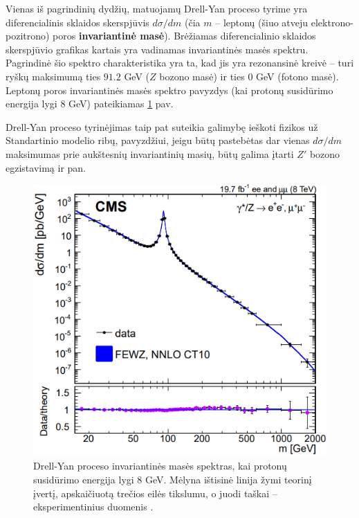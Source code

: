 \documentclass[a4paper, 12pt]{article}
\begin{document}
Vienas iš pagrindinių dydžių, matuojamų Drell-Yan proceso tyrime yra diferencialinis sklaidos skerspjūvis $d\sigma/dm$ (čia $m$ -- leptonų (šiuo atveju elektrono-pozitrono) poros \textbf{invariantinė masė}). Brėžiamas diferencialinio sklaidos skerspjūvio grafikas kartais yra vadinamas invariantinės masės spektru. Pagrindinė šio spektro charakteristika yra ta, kad jis yra rezonansinė kreivė -- turi ryškų maksimumą ties $91.2$ GeV ($Z$ bozono masė) ir ties $0$ GeV (fotono masė). Leptonų poros invariantinės masės spektro pavyzdys (kai protonų susidūrimo energija lygi $8$ GeV) pateikiamas \ref{fig:DYeeCS} pav.

Drell-Yan proceso tyrinėjimas taip pat suteikia galimybę ieškoti fizikos už Standartinio modelio ribų, pavyzdžiui, jeigu būtų pastebėtas dar vienas $d\sigma/dm$ maksimumas prie aukštesnių invariantinių masių, būtų galima įtarti $Z'$ bozono egzistavimą ir pan.
\vspace{0.2cm}

\begin{centering}
\begin{figure}[H]
\centering
\includegraphics[scale=0.6]{DYeeCS.PNG}
\vspace{-0.2cm}
\caption{\label{fig:DYeeCS}
Drell-Yan proceso invariantinės masės spektras, kai protonų susidūrimo energija lygi $8$ GeV. Mėlyna ištisinė linija žymi teorinį įvertį, apskaičiuotą trečios eilės tikslumu, o juodi taškai -- eksperimentinius duomenis \cite{DYpic}.
}
\end{figure}
\end{centering}
\end{document}
